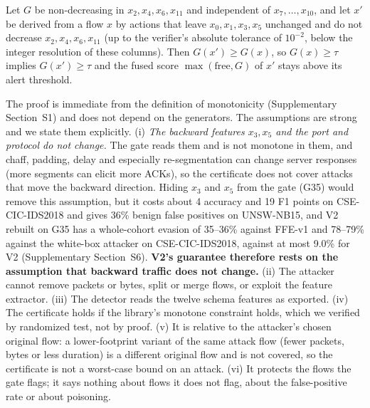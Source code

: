 \begin{proposition}
\label{prop:certificate}
Let $G$ be non-decreasing in $x_2,x_4,x_6,x_{11}$ and independent of $x_7,\dots,x_{10}$, and let $x'$ be derived from a flow $x$ by actions that leave $x_0,x_1,x_3,x_5$ unchanged and do not decrease $x_2,x_4,x_6,x_{11}$ (up to the verifier's absolute tolerance of $10^{-2}$, below the integer resolution of these columns). Then $G(x')\ge G(x)$, so $G(x)\ge\tau$ implies $G(x')\ge\tau$ and the fused score $\max(\text{free},G)$ of $x'$ stays above its alert threshold.
\end{proposition}
The proof is immediate from the definition of monotonicity (Supplementary Section~S1) and does not depend on the generators. The assumptions are strong and we state them explicitly. (i) \emph{The backward features $x_3,x_5$ and the port and protocol do not change.} The gate reads them and is not monotone in them, and chaff, padding, delay and especially re-segmentation can change server responses (more segments can elicit more ACKs), so the certificate does not cover attacks that move the backward direction. Hiding $x_3$ and $x_5$ from the gate (G35) would remove this assumption, but it costs about 4 accuracy and 19 F1 points on CSE-CIC-IDS2018 and gives 36\% benign false positives on UNSW-NB15, and V2 rebuilt on G35 has a whole-cohort evasion of 35--36\% against FFE-v1 and 78--79\% against the white-box attacker on CSE-CIC-IDS2018, against at most 9.0\% for V2 (Supplementary Section~S6). \textbf{V2's guarantee therefore rests on the assumption that backward traffic does not change.} (ii) The attacker cannot remove packets or bytes, split or merge flows, or exploit the feature extractor. (iii) The detector reads the twelve schema features as exported. (iv) The certificate holds if the library's monotone constraint holds, which we verified by randomized test, not by proof. (v) It is relative to the attacker's chosen original flow: a lower-footprint variant of the same attack flow (fewer packets, bytes or less duration) is a different original flow and is not covered, so the certificate is not a worst-case bound on an attack. (vi) It protects the flows the gate flags; it says nothing about flows it does not flag, about the false-positive rate or about poisoning.

